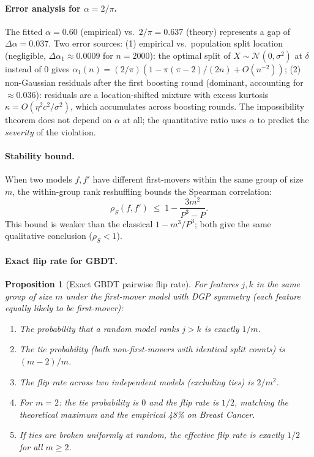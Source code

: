 \documentclass{article}
\newtheorem{proposition}[theorem]{Proposition}
\begin{document}
\paragraph{Error analysis for $\alpha = 2/\pi$.}
The fitted $\alpha = 0.60$ (empirical) vs.\ $2/\pi = 0.637$ (theory) represents a gap of $\Delta\alpha = 0.037$. Two error sources: (1) empirical vs.\ population split location (negligible, $\Delta\alpha_1 \approx 0.0009$ for $n = 2000$): the optimal split of $X \sim \mathcal{N}(0, \sigma^2)$ at $\delta$ instead of $0$ gives $\alpha_1(n) = (2/\pi)(1 - \pi(\pi-2)/(2n) + O(n^{-2}))$; (2) non-Gaussian residuals after the first boosting round (dominant, accounting for $\approx 0.036$): residuals are a location-shifted mixture with excess kurtosis $\kappa = O(\eta^2 c^2/\sigma^2)$, which accumulates across boosting rounds. The impossibility theorem does not depend on $\alpha$ at all; the quantitative ratio uses $\alpha$ to predict the \emph{severity} of the violation.

\paragraph{Stability bound.}
When two models $f, f'$ have different first-movers within the same group of size $m$, the within-group rank reshuffling bounds the Spearman correlation:
\[
    \rho_S(f, f') \;\leq\; 1 - \frac{3m^2}{P^3 - P}.
\]
This bound is weaker than the classical $1 - m^3/P^3$; both give the same qualitative conclusion ($\rho_S < 1$).

\paragraph{Exact flip rate for GBDT.}
\begin{proposition}[Exact GBDT pairwise flip rate]
\label{prop:exact-flip}
For features $j, k$ in the same group of size $m$ under the first-mover model with DGP symmetry (each feature equally likely to be first-mover):
\begin{enumerate}
    \item[(i)] The probability that a random model ranks $j > k$ is exactly $1/m$.
    \item[(ii)] The tie probability (both non-first-movers with identical split counts) is $(m-2)/m$.
    \item[(iii)] The flip rate across two independent models (excluding ties) is $2/m^2$.
    \item[(iv)] For $m = 2$: the tie probability is $0$ and the flip rate is $1/2$, matching the theoretical maximum and the empirical 48\% on Breast Cancer.
    \item[(v)] If ties are broken uniformly at random, the effective flip rate is exactly $1/2$ for all $m \geq 2$.
\end{enumerate}
\end{proposition}
\end{document}

